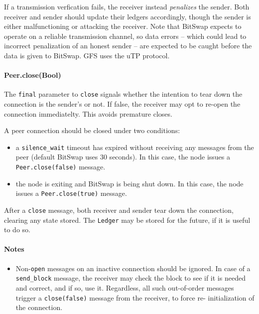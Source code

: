 \documentclass{sig-alternate}
\begin{document}
If a transmission verfication fails, the receiver instead \textit{penalizes}
the sender. Both receiver and sender should update their ledgers accordingly,
though the sender is either malfunctioning or attacking the receiver. Note that
BitSwap expects to operate on a reliable transmission channel, so data errors
-- which could lead to incorrect penalization of an honest sender -- are
expected to be caught before the data is given to BitSwap. GFS uses the uTP
protocol.

\paragraph{Peer.close(Bool)}

The \texttt{final} parameter to \texttt{close} signals whether the intention
to tear down the connection is the sender's or not. If false, the receiver
may opt to re-open the connection immediatelty. This avoids premature
closes.

A peer connection should be closed under two conditions:
\begin{itemize}
  \item a \texttt{silence\_wait} timeout has expired without receiving any
        messages from the peer (default BitSwap uses 30 seconds).
        In this case, the node issues a \texttt{Peer.close(false)} message.
  \item the node is exiting and BitSwap is being shut down.
        In this case, the node issues a \texttt{Peer.close(true)} message.
\end{itemize}

After a \texttt{close} message, both receiver and sender tear down the
connection, clearing any state stored. The \texttt{Ledger} may be stored for
the future, if it is useful to do so.

\paragraph{Notes}

\begin{itemize}
  \item Non-\texttt{open} messages on an inactive connection should be ignored.
        In case of a \texttt{send\_block} message, the receiver may check
        the block to see if it is needed and correct, and if so, use it.
        Regardless, all such out-of-order messages trigger a
        \texttt{close(false)} message from the receiver, to force re-
        initialization of the connection.
\end{itemize}
\end{document}
